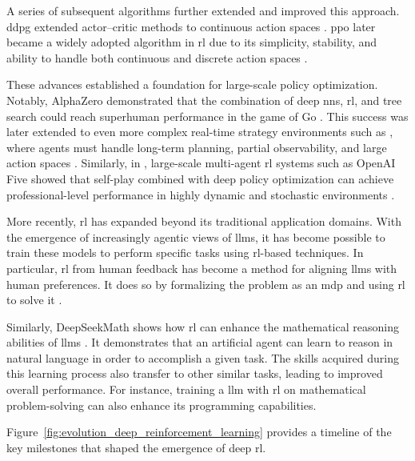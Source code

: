 A series of subsequent algorithms further extended and improved this approach.
\gls{ddpg} extended actor–critic methods to continuous action spaces \parencite{lillicrap2015continuouscontroldeepreinforcement}.
\gls{ppo} later became a widely adopted algorithm in \gls{rl} due to its simplicity, stability, and ability to handle both continuous and discrete action spaces \parencite{schulman2017proximalpolicyoptimizationalgorithms}.

These advances established a foundation for large-scale policy optimization.
Notably, AlphaZero demonstrated that the combination of deep \glspl{nn}, \gls{rl}, and tree search could reach superhuman performance in the game of Go \parencite{silver2017mastering}.  
This success was later extended to even more complex real-time strategy environments such as \StarCraftIIName, where agents must handle long-term planning, partial observability, and large action spaces \parencite{samvelyan2019starcraftmultiagentchallenge}.  
Similarly, in \DotaTwoName, large-scale multi-agent \gls{rl} systems such as OpenAI Five showed that self-play combined with deep policy optimization can achieve professional-level performance in highly dynamic and stochastic environments \parencite{openai2019dota2largescale}.

More recently, \gls{rl} has expanded beyond its traditional application domains. 
With the emergence of increasingly agentic views of \glspl{llm}, it has become possible to train these models to perform specific tasks using \gls{rl}-based techniques.  
In particular, \gls{rl} from human feedback has become a method for aligning \glspl{llm} with human preferences.  
It does so by formalizing the problem as an \gls{mdp} and using \gls{rl} to solve it \parencite{ouyang2022traininglanguagemodelsfollow}.

Similarly, DeepSeekMath shows how \gls{rl} can enhance the mathematical reasoning abilities of \glspl{llm} \parencite{shao2024deepseekmathpushinglimitsmathematical}.
It demonstrates that an artificial agent can learn to reason in natural language in order to accomplish a given task.
The skills acquired during this learning process also transfer to other similar tasks, leading to improved overall performance.
For instance, training a \gls{llm} with \gls{rl} on mathematical problem-solving can also enhance its programming capabilities.

Figure~\ref{fig:evolution_deep_reinforcement_learning} provides a timeline of the key milestones that shaped the emergence of deep \gls{rl}.

